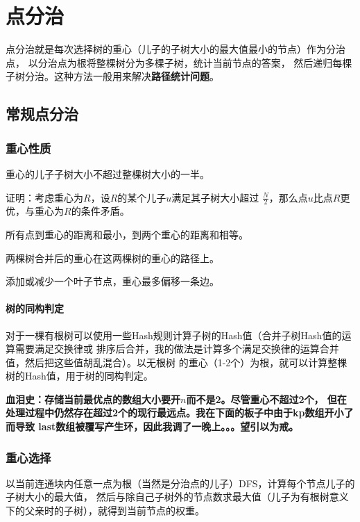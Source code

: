 \section{点分治}
点分治就是每次选择树的重心（儿子的子树大小的最大值最小的节点）作为分治点，
以分治点为根将整棵树分为多棵子树，统计当前节点的答案，
然后递归每棵子树分治。这种方法一般用来解决{\bfseries 路径统计问题}。
\subsection{常规点分治}
\subsubsection{重心性质}
\begin{property}\label{WPP}
    重心的儿子子树大小不超过整棵树大小的一半。
\end{property}
证明：考虑重心为$R$，设$R$的某个儿子$u$满足其子树大小超过
$\frac{N}{2}$，那么点$u$比点$R$更优，与重心为$R$的条件矛盾。
\begin{property}
    所有点到重心的距离和最小，到两个重心的距离和相等。
\end{property}
\begin{property}
    两棵树合并后的重心在这两棵树的重心的路径上。
\end{property}
\begin{property}
    添加或减少一个叶子节点，重心最多偏移一条边。
\end{property}

\paragraph{树的同构判定}
对于一棵有根树可以使用一些Hash规则计算子树的Hash值（合并子树Hash值的运算需要满足交换律或
排序后合并，我的做法是计算多个满足交换律的运算合并值，然后把这些值胡乱混合）。以无根树
的重心（1-2个）为根，就可以计算整棵树的Hash值，用于树的同构判定。

{\bfseries 血泪史：存储当前最优点的数组大小要开$n$而不是2。尽管重心不超过2个，
但在处理过程中仍然存在超过2个的现行最远点。我在下面的板子中由于kp数组开小了而导致
last数组被覆写产生环，因此我调了一晚上。。。望引以为戒。}



\subsubsection{重心选择}
以当前连通块内任意一点为根（当然是分治点的儿子）DFS，计算每个节点儿子的子树大小的最大值，
然后与除自己子树外的节点数求最大值（儿子为有根树意义下的父亲时的子树），就得到当前节点的权重。

